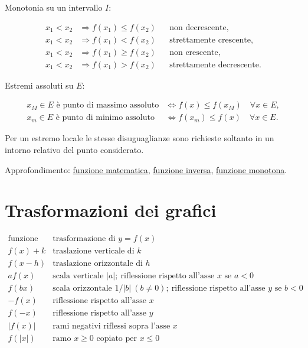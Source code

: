 Monotonia su un intervallo \(I\):

\[
\begin{aligned}
x_1<x_2&\Longrightarrow f(x_1)\le f(x_2)
&&\text{non decrescente},\\
x_1<x_2&\Longrightarrow f(x_1)<f(x_2)
&&\text{strettamente crescente},\\
x_1<x_2&\Longrightarrow f(x_1)\ge f(x_2)
&&\text{non crescente},\\
x_1<x_2&\Longrightarrow f(x_1)>f(x_2)
&&\text{strettamente decrescente}.
\end{aligned}
\]

Estremi assoluti su \(E\):

\[
\begin{aligned}
x_M\in E\text{ è punto di massimo assoluto}
&\Longleftrightarrow f(x)\le f(x_M)\quad\forall x\in E,\\
x_m\in E\text{ è punto di minimo assoluto}
&\Longleftrightarrow f(x_m)\le f(x)\quad\forall x\in E.
\end{aligned}
\]

Per un estremo locale le stesse disuguaglianze sono richieste soltanto in un intorno relativo del punto considerato.

Approfondimento: \href{https://ingegnerismo.it/matematica/funzione-matematica/}{funzione matematica}, \href{https://ingegnerismo.it/matematica/funzione-inversa/}{funzione inversa}, \href{https://ingegnerismo.it/matematica/funzione-monotona/}{funzione monotona}.

\section{Trasformazioni dei grafici}\label{trasformazioni-dei-grafici}

\[
\begin{array}{c|c}
\text{funzione}&\text{trasformazione di }y=f(x)\\
\hline
f(x)+k&\text{traslazione verticale di }k\\
f(x-h)&\text{traslazione orizzontale di }h\\
af(x)&\text{scala verticale }|a|;\ \text{riflessione rispetto all'asse }x\text{ se }a<0\\
f(bx)&\text{scala orizzontale }1/|b|\ (b\ne0);\ \text{riflessione rispetto all'asse }y\text{ se }b<0\\
-f(x)&\text{riflessione rispetto all'asse }x\\
f(-x)&\text{riflessione rispetto all'asse }y\\
|f(x)|&\text{rami negativi riflessi sopra l'asse }x\\
f(|x|)&\text{ramo }x\ge0\text{ copiato per }x\le0
\end{array}
\]

